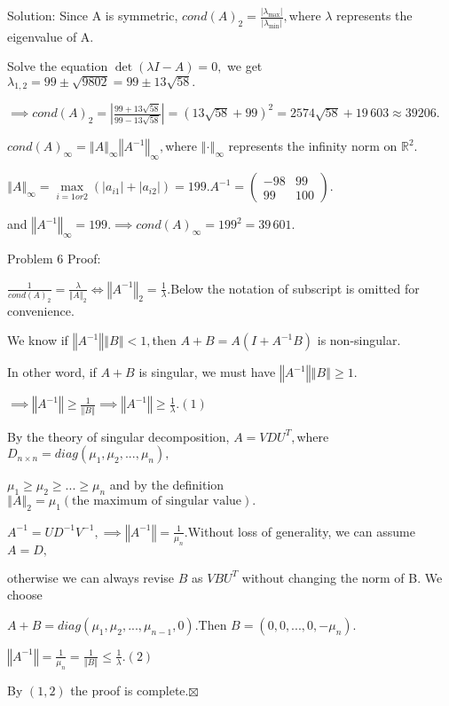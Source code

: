 \documentclass{article}
\begin{document}
Solution: Since A is symmetric, $cond(A)_{2}=\frac{\left\vert \lambda _{\max
}\right\vert }{\left\vert \lambda _{\min }\right\vert },$where $\lambda $
represents the eigenvalue of A.

Solve the equation $\det (\lambda I-A)=0,$ we get $\lambda _{1,2}=99\pm 
\sqrt{9802}=99\pm \allowbreak 13\sqrt{58}.$

$\implies cond(A)_{2}=\left\vert \frac{99+13\sqrt{58}}{99-13\sqrt{58}}%
\right\vert =\left( 13\sqrt{58}+99\right) ^{2}=\allowbreak 2574\sqrt{58}%
+19\,603 \approx 39206$.

$cond(A)_{\infty }=\left\Vert A\right\Vert _{\infty }\left\Vert
A^{-1}\right\Vert _{\infty },$where $\left\Vert \cdot \right\Vert _{\infty }$
represents the infinity norm on $\mathbb{R}^{2}.$

$\left\Vert A\right\Vert _{\infty }=\underset{i=1or2}{\max }\left(
\left\vert a_{i1}\right\vert +\left\vert a_{i2}\right\vert \right)
=199.A^{-1}=\left( 
\begin{array}{cc}
-98 & 99 \\ 
99 & 100%
\end{array}%
\right) .$

and $\left\Vert A^{-1}\right\Vert _{\infty }=199.\implies cond\left(
A\right) _{\infty }=199^{2}=\allowbreak 39\,601.$

Problem 6 \bigskip Proof:

$\frac{1}{cond\left( A\right) _{2}}=\frac{\lambda }{\left\Vert A\right\Vert
_{2}}\iff \left\Vert A^{-1}\right\Vert _{2}=\frac{1}{\lambda }.$Below the
notation of subscript is omitted for convenience.

We know if $\left\Vert A^{-1}\right\Vert \left\Vert B\right\Vert <1,$then $%
A+B=A(I+A^{-1}B)$ is non-singular.

In other word, if $A+B$ is singular, we must have $\left\Vert
A^{-1}\right\Vert \left\Vert B\right\Vert \geq 1.$

$\implies \left\Vert A^{-1}\right\Vert \geq \frac{1}{\left\Vert B\right\Vert 
}\implies \left\Vert A^{-1}\right\Vert \geq \frac{1}{\lambda }.\left(
1\right) $

\bigskip By the theory of singular decomposition, $A=VDU^{T},$where $%
D_{n\times n}=diag\left( \mu _{1},\mu _{2},...,\mu _{n}\right) ,$

$\mu _{1}\geq \mu _{2}\geq ...\geq \mu _{n}$ and by the definition $%
\left\Vert A\right\Vert _{2}=\mu _{1}\left( \text{the maximum of singular
value}\right) .$

$A^{-1}=UD^{-1}V^{-1},\implies \left\Vert A^{-1}\right\Vert =\frac{1}{\mu
_{n}}.$Without loss of generality, we can assume $A=D,$

otherwise we can always revise $B$ as $VBU^{T}$ without changing the norm of
B$.$ We choose

$A+B=diag\left( \mu _{1},\mu _{2},...,\mu _{n-1},0\right) .$Then $B=\left(
0,0,...,0,-\mu _{n}\right) .$

$\left\Vert A^{-1}\right\Vert =\frac{1}{\mu _{n}}=\frac{1}{\left\Vert
B\right\Vert }\leq \frac{1}{\lambda }.\left( 2\right) $

By $\left( 1,2\right) $ the proof is complete.$\boxtimes $
\end{document}
